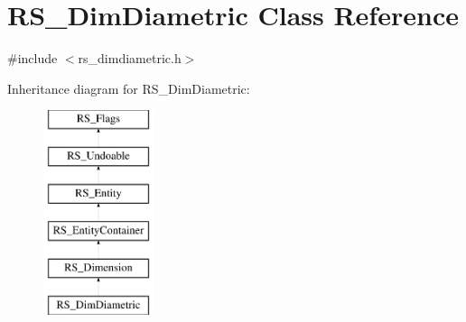 \hypertarget{classRS__DimDiametric}{\section{R\-S\-\_\-\-Dim\-Diametric Class Reference}
\label{classRS__DimDiametric}
}


{\ttfamily \#include $<$rs\-\_\-dimdiametric.\-h$>$}

Inheritance diagram for R\-S\-\_\-\-Dim\-Diametric\-:\begin{figure}[H]
\begin{center}
\leavevmode
\includegraphics[height=6.000000cm]{classRS__DimDiametric}
\end{center}
\end{figure}
